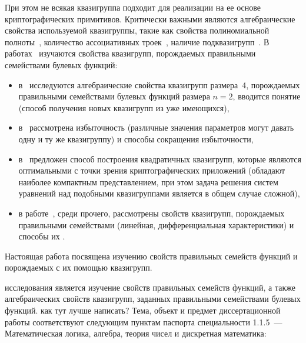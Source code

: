     При этом не всякая квазигруппа подходит для реализации на ее основе криптографических примитивов.
    Критически важными являются алгебраические свойства используемой квазигруппы, такие как свойства полиномиальной полноты~\autocite{hagemann, nipkow1990unification, horvath2008}, количество ассоциативных троек~\autocite{kepka1980note, kotzig83, ass_summary}, наличие подквазигрупп~\autocite{sobyanin19, galatenko21subquasi}.
    В работах~\autocite{piven18, piven19, galatenko20quad, shvaryov24} изучаются свойства квазигрупп, порождаемых правильными семействами булевых функций:
    \begin{itemize}
        \item в~\autocite{piven18} исследуются алгебраические свойства квазигрупп размера~4, порождаемых правильными семействами булевых функций размера $n = 2$, вводится понятие  (способ получения новых квазигрупп из уже имеющихся),
        \item в~\autocite{piven19} рассмотрена избыточность  (различные значения параметров могут давать одну и ту же квазигруппу) и способы сокращения избыточности,
        \item в~\autocite{galatenko20quad} предложен способ построения квадратичных квазигрупп, которые являются оптимальными с точки зрения криптографических приложений (обладают наиболее компактным представлением, при этом задача решения систем уравнений над подобными квазигруппами является в общем случае сложной),
        \item в работе~\autocite{shvaryov24}, среди прочего, рассмотрены  свойств квазигрупп, порождаемых правильными семействами (линейная, дифференциальная характеристики) и способы их .
    \end{itemize}
    Настоящая работа посвящена изучению свойств правильных семейств функций и порождаемых с их помощью квазигрупп. 


\ifsynopsis
\else
\fi

{\aim} исследования является изучение свойств правильных семейств функций, а также алгебраических свойств квазигрупп, заданных правильными семействами булевых функций.
как тут лучше написать?
Тема, объект и предмет диссертационной работы соответствуют следующим пунктам паспорта специальности 1.1.5~--- Математическая логика, алгебра, теория чисел и дискретная математика: 


